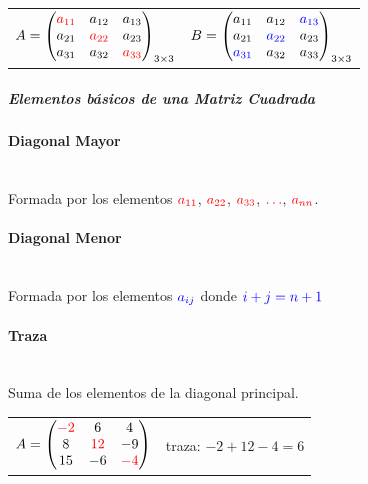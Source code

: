 \documentclass[stu, 12pt, letterpaper, donotrepeattitle, floatsintext, natbib]{apa7}
\newcommand{\myparagraph}[1]{\paragraph{#1}\mbox{}\\}
\begin{document}
    \begin{table}
        \label{tab:matriz-cuadrada}
        \centering
        \begin{tabular}{cc}
            $
            A = \begin{pmatrix}
                    \color{red} a_{11} & a_{12}             & a_{13}             \\
                    a_{21}             & \color{red} a_{22} & a_{23}             \\
                    a_{31}             & a_{32}             & \color{red} a_{33} \\
            \end{pmatrix}_{3\times3}
            $
            &
            $
            B = \begin{pmatrix}
                    a_{11}              & a_{12}              & \color{blue} a_{13} \\
                    a_{21}              & \color{blue} a_{22} & a_{23}              \\
                    \color{blue} a_{31} & a_{32}              & a_{33}              \\
            \end{pmatrix}_{3\times3}
            $
        \end{tabular}
    \end{table}

    \subparagraph{Elementos básicos de una Matriz Cuadrada}
    \myparagraph{Diagonal Mayor}
    Formada por los elementos $\color{red} a_{11}$, $\color{red} a_{22}$, $\color{red} a_{33}$, $\color{red} \ldots$, $\color{red} a_{nn}$.
    \myparagraph{Diagonal Menor}
    Formada por los elementos {\Large $\color{blue} a_{ij}$} donde {\normalsize $\color{blue} i+j = n+1$}
    \myparagraph{Traza}
    Suma de los elementos de la diagonal principal.

    \begin{table}
        \label{tab:traza}
        \centering
        \begin{tabular}{cc}
            $
            A=\begin{pmatrix}
                  \color{red} -2 & 6              & 4              \\
                  8              & \color{red} 12 & -9             \\
                  15             & -6             & \color{red} -4
            \end{pmatrix}
            $ & traza: $-2 +12 -4 = 6$
        \end{tabular}
    \end{table}
\end{document}
